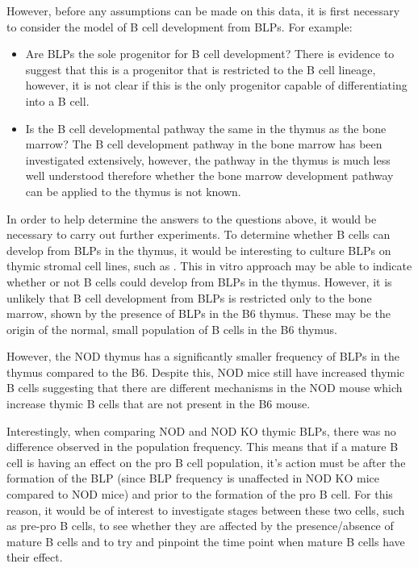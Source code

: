 However, before any assumptions can be made on this data, it is first necessary to consider the model of B cell development from BLPs.
For example:
\begin{itemize}
\item Are BLPs the sole progenitor for B cell development? There is evidence to suggest that this is a progenitor that is restricted to the B cell lineage, however, it is not clear if this is the only progenitor capable of differentiating into a B cell.
\item Is the B cell developmental pathway the same in the thymus as the bone marrow? The B cell development pathway in the bone marrow has been investigated extensively, however, the pathway in the thymus is much less well understood therefore whether the bone marrow development pathway can be applied to the thymus is not known. 
\end{itemize}

In order to help determine the answers to the questions above, it would be necessary to carry out further experiments.
To determine whether B cells can develop from BLPs in the thymus, it would be interesting to culture BLPs on thymic stromal cell lines, such as .
This in vitro approach may be able to indicate whether or not B cells could develop from BLPs in the thymus.
However, it is unlikely that B cell development from BLPs is restricted only to the bone marrow, shown by the presence of BLPs in the B6 thymus.
These may be the origin of the normal, small population of B cells in the B6 thymus.

However, the NOD thymus has a significantly smaller frequency of BLPs in the thymus compared to the B6.
Despite this, NOD mice still have increased thymic B cells suggesting that there are different mechanisms in the NOD mouse which increase thymic B cells that are not present in the B6 mouse.

Interestingly, when comparing NOD and NOD KO thymic BLPs, there was no difference observed in the population frequency.
This means that if a mature B cell is having an effect on the pro B cell population, it's action must be after the formation of the BLP (since BLP frequency is unaffected in NOD KO mice compared to NOD mice) and prior to the formation of the pro B cell.
For this reason, it would be of interest to investigate stages between these two cells, such as pre-pro B cells, to see whether they are affected by the presence/absence of mature B cells and to try and pinpoint the time point when mature B cells have their effect.

